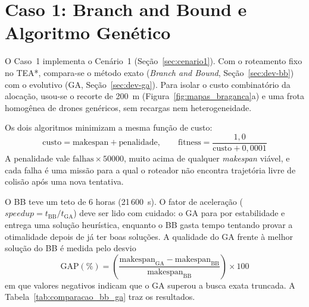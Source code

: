 \section{Caso 1: Branch and Bound e Algoritmo Genético}\label{sec:caso1}

O Caso~1 implementa o Cenário~1 (Seção~\ref{sec:cenario1}). Com o roteamento fixo no TEA*, compara-se o método exato (\textit{Branch and Bound}, Seção~\ref{sec:dev-bb}) com o evolutivo (GA, Seção~\ref{sec:dev-ga}). Para isolar o custo combinatório da alocação, usou-se o recorte de 200~m (Figura~\ref{fig:mapas_braganca}a) e uma frota homogênea de drones genéricos, sem recargas nem heterogeneidade.

Os dois algoritmos minimizam a mesma função de custo:
\begin{equation}
\text{custo} = \text{makespan} + \text{penalidade}, \qquad \text{fitness} = \frac{1{,}0}{\text{custo} + 0{,}0001}
\end{equation}
A penalidade vale $\text{falhas} \times 50000$, muito acima de qualquer \textit{makespan} viável, e cada falha é uma missão para a qual o roteador não encontra trajetória livre de colisão após uma nova tentativa.

O BB teve um teto de 6 horas (21\,600~s). O fator de aceleração ($\textit{speedup} = t_{\text{BB}} / t_{\text{GA}}$) deve ser lido com cuidado: o GA para por estabilidade e entrega uma solução heurística, enquanto o BB gasta tempo tentando provar a otimalidade depois de já ter boas soluções. A qualidade do GA frente à melhor solução do BB é medida pelo desvio
\begin{equation}
\text{GAP} (\%) = \left( \frac{\text{makespan}_{\text{GA}} - \text{makespan}_{\text{BB}}}{\text{makespan}_{\text{BB}}} \right) \times 100
\end{equation}
em que valores negativos indicam que o GA superou a busca exata truncada. A Tabela~\ref{tab:comparacao_bb_ga} traz os resultados.


